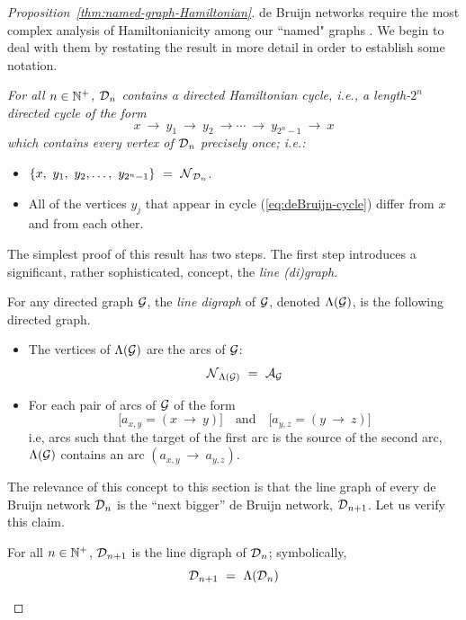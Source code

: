 \begin{proof}[Proposition~\ref{thm:named-graph-Hamiltonian}]
de Bruijn networks require the most complex analysis of Hamiltonianicity among our  ``named" graphs .  
We begin to deal with them by restating the result in more detail in order to establish some notation.

\smallskip

\noindent
{\em
For all $n \in \mathbb{N}^+$, $\mbox{$\cal D$}_n$ contains a {\em directed Hamiltonian cycle}, i.e., a length-$2^n$ 
directed cycle of the form
\begin{equation}
\label{eq:deBruijn-cycle}
 x \ \rightarrow \ y_1 \ \rightarrow \ y_2 \ \rightarrow \cdots \ \rightarrow \ y_{2^n-1} \ \rightarrow \ x
\end{equation}
which contains every vertex of $\mbox{$\cal D$}_n$ precisely once; i.e.:
\begin{itemize}
\item
$\{x, \ y_1, \ y_2, \ldots, \ y_{2^n-1}\} \ = \ \n_{\fd_n}$.
\item
All of the vertices $y_j$ that appear in cycle (\ref{eq:deBruijn-cycle}) differ from $x$ and from each other.
\end{itemize}
}

The simplest proof of this result has two steps.  The first step introduces a significant, rather
sophisticated, concept, the {\it line (di)graph}.

\bigskip

 

For any directed graph $\mbox{$\cal G$}$, the {\it line digraph} of $\mbox{$\cal G$}$, denoted $\Lambda(\mbox{$\cal G$})$, is the
following directed graph.
\begin{itemize}
\item
The vertices of $\Lambda(\mbox{$\cal G$})$ are the arcs of $\mbox{$\cal G$}$:
\[ \n_{{\Lambda}({\cal G})} \ = \ \a_{\fg} \]

\item
For each pair of arcs of $\mbox{$\cal G$}$ of the form
\[ \big[a_{x,y} = (x \ \rightarrow \ y) \big] \ \ \ \mbox{ and } \ \ \ 
\big[a_{y,z} = (y \ \rightarrow \ z) \big]
\]
i.e, arcs such that the target of the first arc is the source of the
second arc, $\Lambda(\mbox{$\cal G$})$ contains an arc $(a_{x,y} \ \rightarrow \ a_{y,z})$.
\end{itemize}
The relevance of this concept to this section is that the line graph of every de Bruijn network
$\mbox{$\cal D$}_n$ is the ``next bigger'' de Bruijn network, $\mbox{$\cal D$}_{n+1}$.  Let us verify this claim.

\begin{lemma}
\label{thm:deBruin-linegraph}
For all $n \in \mathbb{N}^+$, $\mbox{$\cal D$}_{n+1}$ is the line digraph of $\mbox{$\cal D$}_n$; symbolically,
\[ \mbox{$\cal D$}_{n+1} \ = \ \Lambda(\mbox{$\cal D$}_n) \]
\end{lemma}


\end{proof}
